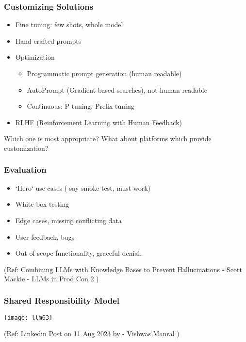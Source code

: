 \begin{frame}[fragile]\frametitle{Customizing Solutions}

\begin{itemize}
\item Fine tuning: few shots, whole model
\item Hand crafted prompts
\item Optimization
	\begin{itemize}
	\item Programmatic prompt generation (human readable)
	\item AutoPrompt (Gradient based searches), not human readable
	\item Continuous: P-tuning, Prefix-tuning
	\end{itemize}
\item RLHF (Reinforcement Learning with Human Feedback)
\end{itemize}	

Which one is most appropriate? What about platforms which provide customization?
\end{frame}


\begin{frame}[fragile]\frametitle{Evaluation}

\begin{itemize}
\item `Hero` use cases ( say smoke test, must work)
\item White box testing
\item Edge cases, missing conflicting data
\item User feedback, bugs
\item Out of scope functionality, graceful denial.
\end{itemize}

{\tiny (Ref: Combining LLMs with Knowledge Bases to Prevent Hallucinations - Scott Mackie - LLMs in Prod Con 2 )}

\end{frame}

\begin{frame}[fragile]\frametitle{Shared Responsibility Model}

\begin{center}
\texttt{[image: llm63]}
\end{center}		


{\tiny (Ref: Linkedin Post on 11 Aug 2023 by - Vishwas Manral )}

\end{frame}


